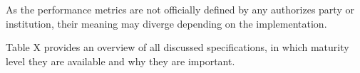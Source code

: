 As the performance metrics are not officially defined by any authorizes party or institution, their meaning may diverge depending on the implementation.

Table X provides an overview of all discussed specifications, in which maturity level they are available and why they are important.





